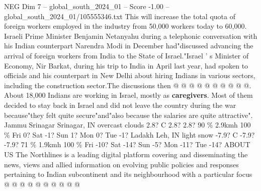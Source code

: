\begin{textsample}{NEG Dim 7 – global\_south\_2024\_01 – Score -1.00 – global\_south\_2024\_01/105555346.txt}
This will increase the total quota of foreign workers employed in the industry from 50,000 workers today to 60,000.
Israeli Prime Minister Benjamin Netanyahu during a telephonic conversation with his Indian counterpart Narendra Modi in December had"discussed advancing the arrival of foreign workers from India to the State of Israel."Israel ' s Minister of Economy, Nir Barkat, during his trip to India in April last year, had spoken to officials and his counterpart in New Delhi about hiring Indians in various sectors, including the construction sector.The discussions then @ @ @ @ @ @ @ @ @ @.
About 18,000 Indians are working in Israel, mostly as \textbf{caregivers}.
Most of them decided to stay back in Israel and did not leave the country during the war because"they felt quite secure"and"also because the salaries are quite attractive".
Jammu Srinagar Srinagar, IN overcast clouds 2.8?
C 2.8? 2.8? 90 \% 2.9kmh 100 \% Fri 0?
Sat -1?
Sun 1?
Mon 0?
Tue -1?
Ladakh Leh, IN light snow -7.9?
C -7.9? -7.9? 71 \% 1.9kmh 100 \% Fri -10?
Sat -14?
Sun -5?
Mon -11?
Tue -14?
ABOUT US The Northlines is a leading digital platform covering and disseminating the news, views and allied information on evolving public policies and responses pertaining to Indian subcontinent and its neighbourhood with a particular focus @ @ @ @ @ @ @ @ @ @

\end{textsample}
